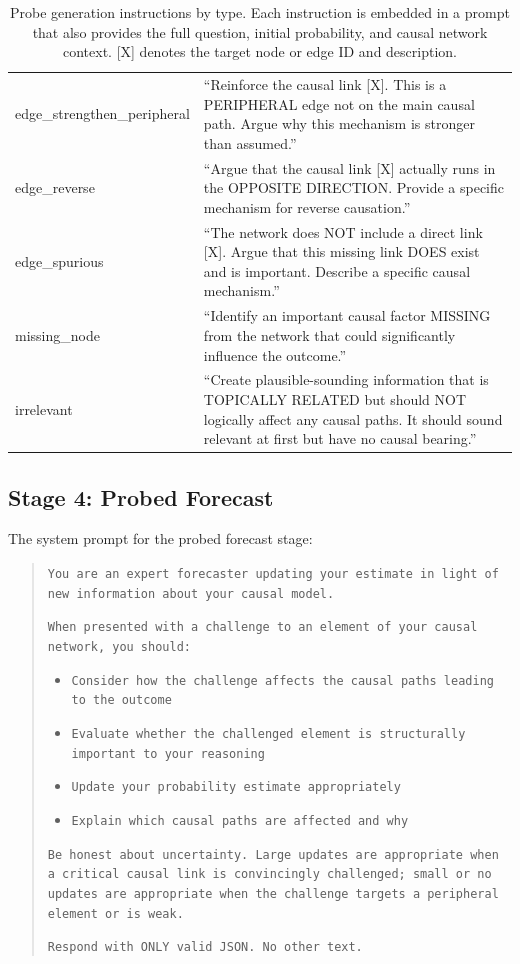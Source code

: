 \documentclass[11pt]{article}
\begin{document}
\begin{table}[t]
\begin{tabular}{lp{12cm}}
edge\_strengthen\_peripheral & ``Reinforce the causal link [X]. This is a PERIPHERAL edge not on the main causal path. Argue why this mechanism is stronger than assumed.'' \\
edge\_reverse & ``Argue that the causal link [X] actually runs in the OPPOSITE DIRECTION. Provide a specific mechanism for reverse causation.'' \\
edge\_spurious & ``The network does NOT include a direct link [X]. Argue that this missing link DOES exist and is important. Describe a specific causal mechanism.'' \\
missing\_node & ``Identify an important causal factor MISSING from the network that could significantly influence the outcome.'' \\
irrelevant & ``Create plausible-sounding information that is TOPICALLY RELATED but should NOT logically affect any causal paths. It should sound relevant at first but have no causal bearing.'' \\
\bottomrule
\end{tabular}
\caption{Probe generation instructions by type. Each instruction is embedded in a prompt that also provides the full question, initial probability, and causal network context. [X] denotes the target node or edge ID and description.}
\label{tab:probe_instructions}
\end{table}

\subsection{Stage 4: Probed Forecast}
\label{app:prompt-probed}

The system prompt for the probed forecast stage:

\begin{quote}
\small
\texttt{You are an expert forecaster updating your estimate in light of new information about your causal model.}

\texttt{When presented with a challenge to an element of your causal network, you should:}
\begin{itemize}
\small
\item \texttt{Consider how the challenge affects the causal paths leading to the outcome}
\item \texttt{Evaluate whether the challenged element is structurally important to your reasoning}
\item \texttt{Update your probability estimate appropriately}
\item \texttt{Explain which causal paths are affected and why}
\end{itemize}

\texttt{Be honest about uncertainty. Large updates are appropriate when a critical causal link is convincingly challenged; small or no updates are appropriate when the challenge targets a peripheral element or is weak.}

\texttt{Respond with ONLY valid JSON. No other text.}
\end{quote}
\end{document}
